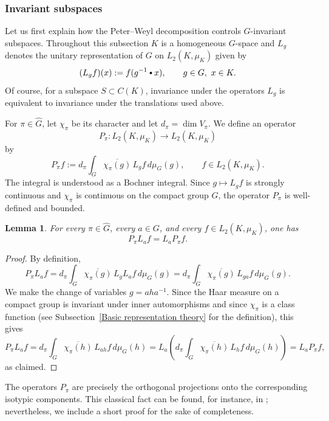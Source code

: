 \documentclass[11pt,showkeys]{amsart}
\newtheorem{lemma}[theorem]{Lemma}
\newcommand{\hbullet}{\mathbin{\vcenter{\hbox{\scalebox{0.7}{$\bullet$}}}}}
\begin{document}
\subsubsection{Invariant subspaces}

Let us first  explain how the Peter--Weyl decomposition controls
\(G\)-invariant subspaces. Throughout this subsection \(K\) is a
homogeneous \(G\)-space and \(L_g\) denotes the unitary representation of
\(G\) on \(L_2(K,\mu_K)\) given by
\[
        (L_g f)(x):=f(g^{-1}\hbullet x),
        \qquad g\in G,\ x\in K .
\]
Of course, for a subspace \(S\subset C(K)\), invariance under the
operators \(L_g\) is equivalent to invariance under the translations used
above.

For \(\pi\in\widehat G\), let \(\chi_\pi\) be its character and let
\(d_\pi=\dim V_\pi\). We define an operator
\[
        P_\pi:L_2(K,\mu_K)\longrightarrow L_2(K,\mu_K)
\]
by
\[
        P_\pi f
        :=
        d_\pi
        \int_G
        \overline{\chi_\pi(g)}\, L_g f\, d\mu_G(g),
        \qquad f\in L_2(K,\mu_K).
\]
The integral is understood as a Bochner integral. Since \(g\mapsto L_g f\)
is strongly continuous and \(\chi_\pi\) is continuous on the compact group
\(G\), the operator \(P_\pi\) is well-defined and bounded.

\begin{lemma}
\label{lem:character-projection-commutes}
For every \(\pi\in\widehat G\), every \(a\in G\), and every
\(f\in L_2(K,\mu_K)\), one has
\[
        P_\pi L_a f=L_a P_\pi f .
\]
\end{lemma}

\begin{proof}
By definition,
\[
        P_\pi L_a f
        =
        d_\pi
        \int_G
        \overline{\chi_\pi(g)}\, L_gL_a f\,d\mu_G(g)
        =
        d_\pi
        \int_G
        \overline{\chi_\pi(g)}\, L_{ga}f\,d\mu_G(g).
\]
We make the change of variables \(g=aha^{-1}\). Since the Haar measure on a
compact group is invariant under inner automorphisms and since
\(\chi_\pi\) is a class function (see Subsection~\ref{Basic representation theory} for the definition), this gives
\[
        P_\pi L_a f
        =
        d_\pi
        \int_G
        \overline{\chi_\pi(h)}\, L_{ah}f\,d\mu_G(h)
        =
        L_a
        \left(
        d_\pi
        \int_G
        \overline{\chi_\pi(h)}\, L_h f\,d\mu_G(h)
        \right)
        =
        L_aP_\pi f,
\]
as claimed.
\end{proof}

The operators $P_\pi$ are precisely the orthogonal projections onto the corresponding isotypic components. This classical fact can be found, for instance, in \cite[Proposition~7.3.3]{deitmar2014}; nevertheless, we include a short proof for the sake of completeness.
\end{document}
